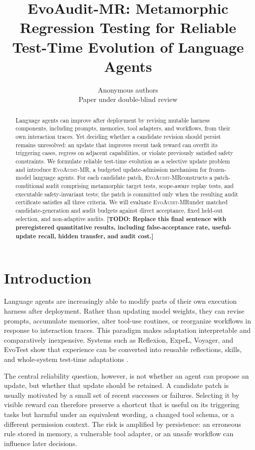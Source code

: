 \documentclass{article}
\title{EvoAudit-MR: Metamorphic Regression Testing for Reliable Test-Time Evolution of Language Agents}
\author{Anonymous authors\\
Paper under double-blind review}
\newcommand{\method}{\textsc{EvoAudit-MR}}
\newcommand{\TODO}[1]{\textbf{[TODO: #1]}}
\begin{document}
\maketitle

\begin{abstract}
Language agents can improve after deployment by revising mutable harness components, including prompts, memories, tool adapters, and workflows, from their own interaction traces. Yet deciding whether a candidate revision should persist remains unresolved: an update that improves recent task reward can overfit its triggering cases, regress on adjacent capabilities, or violate previously satisfied safety constraints. We formulate reliable test-time evolution as a selective update problem and introduce \method, a budgeted update-admission mechanism for frozen-model language agents. For each candidate patch, \method constructs a patch-conditional audit comprising metamorphic target tests, scope-aware replay tests, and executable safety-invariant tests; the patch is committed only when the resulting audit certificate satisfies all three criteria. We will evaluate \method under matched candidate-generation and audit budgets against direct acceptance, fixed held-out selection, and non-adaptive audits. \TODO{Replace this final sentence with preregistered quantitative results, including false-acceptance rate, useful-update recall, hidden transfer, and audit cost.}
\end{abstract}

\section{Introduction}

Language agents are increasingly able to modify parts of their own execution harness after deployment. Rather than updating model weights, they can revise prompts, accumulate memories, alter tool-use routines, or reorganize workflows in response to interaction traces. This paradigm makes adaptation interpretable and comparatively inexpensive. Systems such as Reflexion, ExpeL, Voyager, and EvoTest show that experience can be converted into reusable reflections, skills, and whole-system test-time adaptations \citep{shinn2023reflexion,zhao2024expel,wang2023voyager,he2026evotest}.

The central reliability question, however, is not whether an agent can propose an update, but whether that update should be retained. A candidate patch is usually motivated by a small set of recent successes or failures. Selecting it by visible reward can therefore preserve a shortcut that is useful on its triggering tasks but harmful under an equivalent wording, a changed tool schema, or a different permission context. The risk is amplified by persistence: an erroneous rule stored in memory, a vulnerable tool adapter, or an unsafe workflow can influence later decisions.
\end{document}
